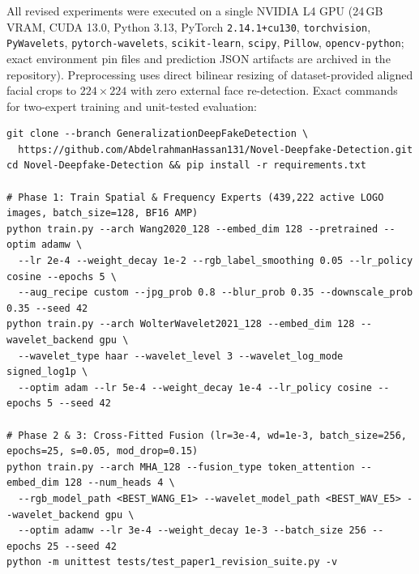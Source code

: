 \documentclass[fleqn,10pt]{wlscirep}
\begin{document}
All revised experiments were executed on a single NVIDIA L4 GPU (24\,GB VRAM, CUDA 13.0, Python 3.13, PyTorch \texttt{2.14.1+cu130}, \texttt{torchvision}, \texttt{PyWavelets}, \texttt{pytorch-wavelets}, \texttt{scikit-learn}, \texttt{scipy}, \texttt{Pillow}, \texttt{opencv-python}; exact environment pin files and prediction JSON artifacts are archived in the repository). Preprocessing uses direct bilinear resizing of dataset-provided aligned facial crops to $224 \times 224$ with zero external face re-detection. Exact commands for two-expert training and unit-tested evaluation:
\begin{verbatim}
git clone --branch GeneralizationDeepFakeDetection \
  https://github.com/AbdelrahmanHassan131/Novel-Deepfake-Detection.git
cd Novel-Deepfake-Detection && pip install -r requirements.txt

# Phase 1: Train Spatial & Frequency Experts (439,222 active LOGO images, batch_size=128, BF16 AMP)
python train.py --arch Wang2020_128 --embed_dim 128 --pretrained --optim adamw \
  --lr 2e-4 --weight_decay 1e-2 --rgb_label_smoothing 0.05 --lr_policy cosine --epochs 5 \
  --aug_recipe custom --jpg_prob 0.8 --blur_prob 0.35 --downscale_prob 0.35 --seed 42
python train.py --arch WolterWavelet2021_128 --embed_dim 128 --wavelet_backend gpu \
  --wavelet_type haar --wavelet_level 3 --wavelet_log_mode signed_log1p \
  --optim adam --lr 5e-4 --weight_decay 1e-4 --lr_policy cosine --epochs 5 --seed 42

# Phase 2 & 3: Cross-Fitted Fusion (lr=3e-4, wd=1e-3, batch_size=256, epochs=25, s=0.05, mod_drop=0.15)
python train.py --arch MHA_128 --fusion_type token_attention --embed_dim 128 --num_heads 4 \
  --rgb_model_path <BEST_WANG_E1> --wavelet_model_path <BEST_WAV_E5> --wavelet_backend gpu \
  --optim adamw --lr 3e-4 --weight_decay 1e-3 --batch_size 256 --epochs 25 --seed 42
python -m unittest tests/test_paper1_revision_suite.py -v
\end{verbatim}
\end{document}
